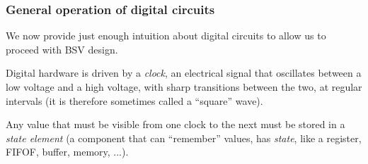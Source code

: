 \begin{frame}
\frametitle{General operation of digital circuits}

We now provide just enough intuition about digital circuits to allow
us to proceed with BSV design.

\vspace*{5ex}

Digital hardware is driven by a \emph{clock}, an electrical signal
that oscillates between a low voltage and a high voltage, with sharp
transitions between the two, at regular intervals (it is therefore
sometimes called a ``square'' wave).

\vspace{1ex}

\begin{center}
\end{center}

\vspace{1ex}

Any value that must be visible from one clock to the next must be
stored in a \emph{state element} (a component that can ``remember''
values, {\ie} has \emph{state}, like a register, FIFOF, buffer,
memory, ...).

\end{frame}


